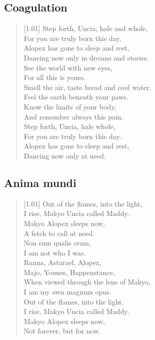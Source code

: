 \subsection{Coagulation}

\begin{verse}[1.01\textwidth]
Step forth, Uncia, hale and whole,\\
\vin For you are truly born this day.\\
Alopex has gone to sleep and rest,\\
\vin Dancing now only in dreams and stories.\\
See the world with new eyes,\\
\vin For all this is yours.\\
Smell the air, taste bread and cool water.\\
\vin Feel the earth beneath your paws.\\
Know the limits of your body,\\
\vin And remember always this pain.\\
Step forth, Uncia, hale whole,\\
\vin For you are truly born this day.\\
Alopex has gone to sleep and rest,\\
\vin Dancing now only at need.\\
\end{verse}
\newpage

\subsection{Anima mundi}

\begin{verse}[1.01\textwidth]
Out of the flames, into the light,\\
\vin I rise, Makyo Uncia called Maddy.\\
Makyo Alopex sleeps now,\\
\vin A fetch to call at need.\\
Non sum qualis eram,\\
\vin I am not who I was.\\
Ranna, Astarael, Alopex,\\
\vin Majo, Younes, Happenstance.\\
When viewed through the lens of Makyo,\\
\vin I am my own magnum opus.\\
Out of the flames, into the light,\\
\vin I rise, Makyo Uncia called Maddy.\\
Makyo Alopex sleeps now,\\
\vin Not forever, but for now.
\end{verse}
